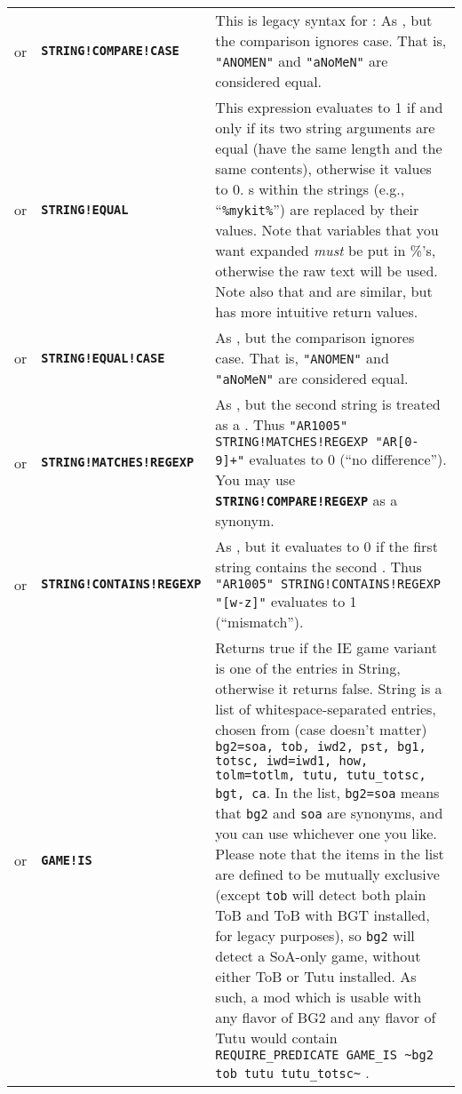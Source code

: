 \documentclass{article}
\def\ttref#1{\ahrefloc{#1}{\tt #1}}
\def\DEFINE#1{{\tt \bf #1}\label{#1}\index{#1}}
\def\t#1{{\tt #1}}
\begin{document}
\begin{tabular}{cp{10in}|p{10in}}
or & \ttref{String} \DEFINE{STRING!COMPARE!CASE} \ttref{String} &
This is legacy syntax for \ttref{STRING!EQUAL!CASE}:
As \ttref{STRING!COMPARE}, but the comparison ignores case. That is,
\t{"ANOMEN"} and \t{"aNoMeN"} are considered equal.\\

or & \ttref{String} \DEFINE{STRING!EQUAL} \ttref{String} &
This expression evaluates to 1 if and only if its two string arguments are
equal (have the same length and the same contents), otherwise it values to 0.
\ttref{variable}s within the strings (e.g., ``\t{\%mykit\%}'') are replaced
by their values.
Note that variables that you want expanded \emph{must} be put in \%'s,
otherwise the raw text will be used.
Note also that \ttref{STRING!EQUAL} and \ttref{STRING!COMPARE} are similar, 
but \ttref{STRING!EQUAL} has more intuitive return values. \\

or & \ttref{String} \DEFINE{STRING!EQUAL!CASE} \ttref{String} &
As \ttref{STRING!EQUAL}, but the comparison ignores case. That is,
\t{"ANOMEN"} and \t{"aNoMeN"} are considered equal.\\

or & \ttref{String} \DEFINE{STRING!MATCHES!REGEXP} \ttref{String} &
As \ttref{STRING!COMPARE!CASE}, but the second string is treated as a
\ttref{regexp}. Thus \t{"AR1005" STRING!MATCHES!REGEXP "AR[0-9]+"}
evaluates to 0 (``no difference''). You may use
\DEFINE{STRING!COMPARE!REGEXP} as a synonym. \\                           

or & \ttref{String} \DEFINE{STRING!CONTAINS!REGEXP} \ttref{String} &
As \ttref{STRING!MATCHES!REGEXP}, but it evaluates to 0 if the first string
contains the second \ttref{regexp}. Thus \t{"AR1005" STRING!CONTAINS!REGEXP
"[w-z]"} evaluates to 1 (``mismatch''). \\

or & \DEFINE{GAME!IS} \ttref{String} & Returns true if the IE game variant
is one of the entries in String, otherwise it returns false. String is a list of
whitespace-separated entries, chosen from (case doesn't matter)
\verb+bg2=soa, tob, iwd2, pst, bg1, totsc, iwd=iwd1, how, tolm=totlm, tutu, tutu_totsc, bgt, ca+.
In the list, \verb+bg2=soa+ means that \verb+bg2+ and \verb+soa+ are synonyms,
and you can use whichever one you like. Please note that the items in the list are
defined to be mutually exclusive (except \verb+tob+ will detect both plain ToB
and ToB with BGT installed, for legacy purposes), so \verb+bg2+ will detect a
SoA-only game, without either ToB or Tutu installed. As such, a mod which is
usable with any flavor of BG2 and any flavor of Tutu would contain
\verb+REQUIRE_PREDICATE GAME_IS ~bg2 tob tutu tutu_totsc~+ . \\


\end{tabular}
\end{document}
